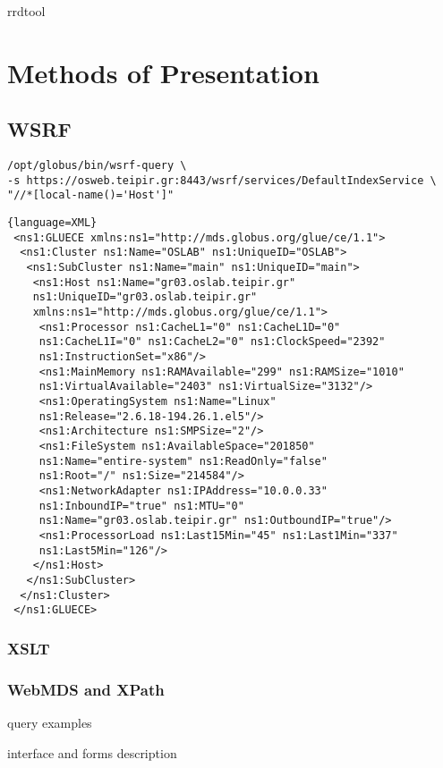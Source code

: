 rrdtool
\newpage

\section{Methods of Presentation}


\subsection{WSRF}
\begin{verbatim}
/opt/globus/bin/wsrf-query \
-s https://osweb.teipir.gr:8443/wsrf/services/DefaultIndexService \
"//*[local-name()='Host']"
\end{verbatim}


\begin{lstlisting}{language=XML}
 <ns1:GLUECE xmlns:ns1="http://mds.globus.org/glue/ce/1.1">
  <ns1:Cluster ns1:Name="OSLAB" ns1:UniqueID="OSLAB">
   <ns1:SubCluster ns1:Name="main" ns1:UniqueID="main">
    <ns1:Host ns1:Name="gr03.oslab.teipir.gr" 
    ns1:UniqueID="gr03.oslab.teipir.gr" 
    xmlns:ns1="http://mds.globus.org/glue/ce/1.1">
     <ns1:Processor ns1:CacheL1="0" ns1:CacheL1D="0" 
     ns1:CacheL1I="0" ns1:CacheL2="0" ns1:ClockSpeed="2392" 
     ns1:InstructionSet="x86"/>
     <ns1:MainMemory ns1:RAMAvailable="299" ns1:RAMSize="1010" 
     ns1:VirtualAvailable="2403" ns1:VirtualSize="3132"/>
     <ns1:OperatingSystem ns1:Name="Linux"
     ns1:Release="2.6.18-194.26.1.el5"/>
     <ns1:Architecture ns1:SMPSize="2"/>
     <ns1:FileSystem ns1:AvailableSpace="201850" 
     ns1:Name="entire-system" ns1:ReadOnly="false"
     ns1:Root="/" ns1:Size="214584"/>
     <ns1:NetworkAdapter ns1:IPAddress="10.0.0.33" 
     ns1:InboundIP="true" ns1:MTU="0" 
     ns1:Name="gr03.oslab.teipir.gr" ns1:OutboundIP="true"/>
     <ns1:ProcessorLoad ns1:Last15Min="45" ns1:Last1Min="337"
     ns1:Last5Min="126"/>
    </ns1:Host>
   </ns1:SubCluster>
  </ns1:Cluster>
 </ns1:GLUECE>
\end{lstlisting}

\subsubsection{XSLT}
\newpage

\subsubsection{WebMDS and XPath}
query examples

interface and forms description
\newpage

